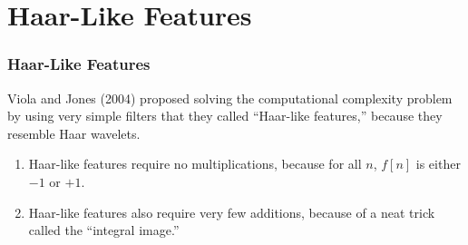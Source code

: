 \documentclass{beamer}
\begin{document}
\section[Features]{Haar-Like Features}
\setcounter{subsection}{1}

\begin{frame}
  \frametitle{Haar-Like Features}

  Viola and Jones (2004) proposed solving the computational complexity
  problem by using very simple filters that they called ``Haar-like
  features,'' because they resemble Haar wavelets.
  \begin{enumerate}
  \item Haar-like features require no multiplications, because for all
    $n$, $f[n]$ is either $-1$ or $+1$.
  \item Haar-like features also require very few additions, because of
    a neat trick called the ``integral image.''
  \end{enumerate}
\end{frame}
\end{document}
